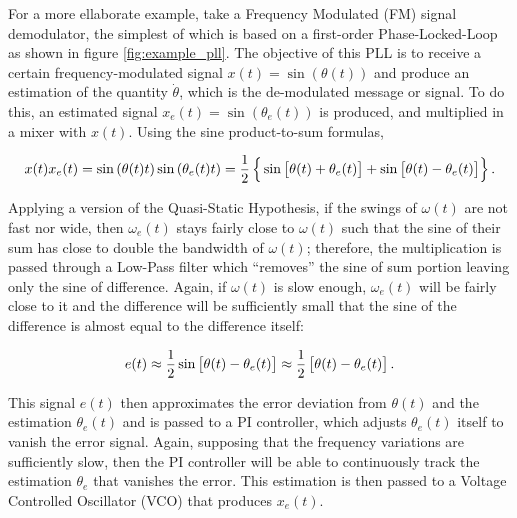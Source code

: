  	For a more ellaborate example, take a Frequency Modulated (FM) signal demodulator, the simplest of which is based on a first-order Phase-Locked-Loop as shown in figure \ref{fig:example_pll}. The objective of this PLL is to receive a certain frequency-modulated signal $x(t) = \sin\left(\theta(t)\right)$ and produce an estimation of the quantity $\dot{\theta}$, which is the de-modulated message or signal. To do this, an estimated signal $x_e(t) = \sin\left(\theta_e(t)\right)$ is produced, and multiplied in a mixer with $x(t)$. Using the sine product-to-sum formulas,

\begin{equation} x(t)x_e(t) = \sin\left(\theta(t)t\right)\sin\left(\theta_e(t)t\right) = \dfrac{1}{2}\left\{\raisebox{4mm}{} \sin\left[\raisebox{3mm}{} \theta(t) + \theta_e(t)\right] + \sin\left[\raisebox{3mm}{}\theta(t) - \theta_e(t)\right]\right\} . \end{equation}

	Applying a version of the Quasi-Static Hypothesis, if the swings of $\omega(t)$ are not fast nor wide, then $\omega_e(t)$ stays fairly close to $\omega(t)$ such that the sine of their sum has close to double the bandwidth of $\omega(t)$; therefore, the multiplication is passed through a Low-Pass filter which ``removes'' the sine of sum portion leaving only the sine of difference. Again, if $\omega(t)$ is slow enough, $\omega_e(t)$ will be fairly close to it and the difference will be sufficiently small that the sine of the difference is almost equal to the difference itself:

\begin{equation} e(t) \approx \dfrac{1}{2}\sin\left[\raisebox{3mm}{}\theta(t) - \theta_e(t)\right] \approx \dfrac{1}{2}\left[\raisebox{3mm}{}\theta(t) - \theta_e(t)\right] . \end{equation}

	This signal $e(t)$ then approximates the error deviation from $\theta(t)$ and the estimation $\theta_e(t)$ and is passed to a PI controller, which adjusts $\theta_e(t)$ itself to vanish the error signal. Again, supposing that the frequency variations are sufficiently slow, then the PI controller will be able to continuously track the estimation $\theta_e$ that vanishes the error. This estimation is then passed to a Voltage Controlled Oscillator (VCO) that produces $x_e(t)$.

